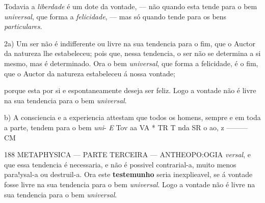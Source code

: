 Todavia a \emph{liberdade} é um dote da vontade, --- não quando esta tende para o bem \emph{universal}, que forma a \emph{felicidade}, --- mas só quando tende para os bens \emph{particulares}.


 

2a) Um ser não é indifferente ou livre na sua tendencia para o fim, que o Auctor da natureza lhe estabeleceu; pois que, nessa tendencia, o ser não se determina a si mesmo, mas é determinado. Ora o bem \emph{universal}, que forma a felicidade, é o fim, que o Auctor da natureza estabeleceu á nossa vontade;

porque esta por si e espontaneamente deseja ser feliz. Logo a vontade não é livre na sua tendencia para o bem \emph{universal}.

b) A consciencia e a experiencia attestam que todos os homens, sempre e em toda a parte, tendem para o bem \emph{uni}-   \emph{E} Tov aa VA * TR T nda SR o ao, z --------- CM

188 METAPHYSICA --- PARTE TERCEIRA --- ANTHEOPO:OGIA \emph{versal}, e que essa tendencia é necessaria, e não é possivel contrarial-a, muito menos para!ysal-a ou destruil-a. Ora este \textbf{testemunho} seria inexplieavel, se á vontade fosse livre na sua tendencia para o bem \emph{universal}. Logo a vontade não é livre na sua tendencia para o bem \emph{universal}.

